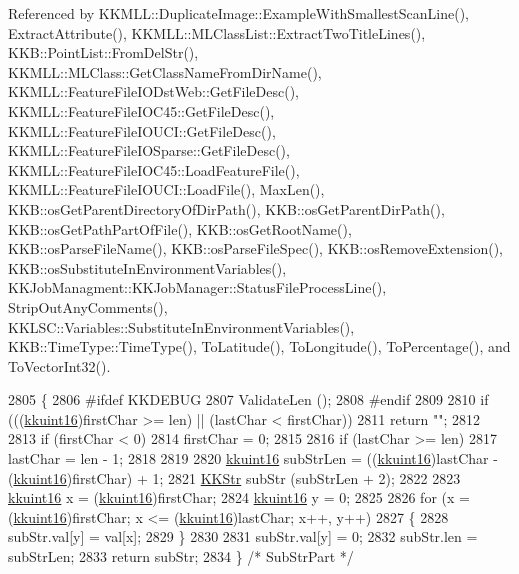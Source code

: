Referenced by K\+K\+M\+L\+L\+::\+Duplicate\+Image\+::\+Example\+With\+Smallest\+Scan\+Line(), Extract\+Attribute(), K\+K\+M\+L\+L\+::\+M\+L\+Class\+List\+::\+Extract\+Two\+Title\+Lines(), K\+K\+B\+::\+Point\+List\+::\+From\+Del\+Str(), K\+K\+M\+L\+L\+::\+M\+L\+Class\+::\+Get\+Class\+Name\+From\+Dir\+Name(), K\+K\+M\+L\+L\+::\+Feature\+File\+I\+O\+Dst\+Web\+::\+Get\+File\+Desc(), K\+K\+M\+L\+L\+::\+Feature\+File\+I\+O\+C45\+::\+Get\+File\+Desc(), K\+K\+M\+L\+L\+::\+Feature\+File\+I\+O\+U\+C\+I\+::\+Get\+File\+Desc(), K\+K\+M\+L\+L\+::\+Feature\+File\+I\+O\+Sparse\+::\+Get\+File\+Desc(), K\+K\+M\+L\+L\+::\+Feature\+File\+I\+O\+C45\+::\+Load\+Feature\+File(), K\+K\+M\+L\+L\+::\+Feature\+File\+I\+O\+U\+C\+I\+::\+Load\+File(), Max\+Len(), K\+K\+B\+::os\+Get\+Parent\+Directory\+Of\+Dir\+Path(), K\+K\+B\+::os\+Get\+Parent\+Dir\+Path(), K\+K\+B\+::os\+Get\+Path\+Part\+Of\+File(), K\+K\+B\+::os\+Get\+Root\+Name(), K\+K\+B\+::os\+Parse\+File\+Name(), K\+K\+B\+::os\+Parse\+File\+Spec(), K\+K\+B\+::os\+Remove\+Extension(), K\+K\+B\+::os\+Substitute\+In\+Environment\+Variables(), K\+K\+Job\+Managment\+::\+K\+K\+Job\+Manager\+::\+Status\+File\+Process\+Line(), Strip\+Out\+Any\+Comments(), K\+K\+L\+S\+C\+::\+Variables\+::\+Substitute\+In\+Environment\+Variables(), K\+K\+B\+::\+Time\+Type\+::\+Time\+Type(), To\+Latitude(), To\+Longitude(), To\+Percentage(), and To\+Vector\+Int32().


\begin{DoxyCode}
2805 \{
2806 \textcolor{preprocessor}{  #ifdef  KKDEBUG}
2807   ValidateLen ();
2808 \textcolor{preprocessor}{  #endif}
2809 
2810   \textcolor{keywordflow}{if}  (((\hyperlink{namespace_k_k_b_aa8c7d4d30381c8a0b6fce68974a9c8a9}{kkuint16})firstChar >= len)  ||  (lastChar < firstChar))
2811     \textcolor{keywordflow}{return}  \textcolor{stringliteral}{""};
2812 
2813   \textcolor{keywordflow}{if}  (firstChar < 0)
2814     firstChar = 0;
2815 
2816   \textcolor{keywordflow}{if}  (lastChar >= len)
2817     lastChar = len - 1;
2818 
2819 
2820   \hyperlink{namespace_k_k_b_aa8c7d4d30381c8a0b6fce68974a9c8a9}{kkuint16}  subStrLen = ((\hyperlink{namespace_k_k_b_aa8c7d4d30381c8a0b6fce68974a9c8a9}{kkuint16})lastChar - (\hyperlink{namespace_k_k_b_aa8c7d4d30381c8a0b6fce68974a9c8a9}{kkuint16})firstChar) + 1;
2821   \hyperlink{class_k_k_b_1_1_k_k_str}{KKStr}  subStr (subStrLen + 2);
2822 
2823   \hyperlink{namespace_k_k_b_aa8c7d4d30381c8a0b6fce68974a9c8a9}{kkuint16}  x = (\hyperlink{namespace_k_k_b_aa8c7d4d30381c8a0b6fce68974a9c8a9}{kkuint16})firstChar;
2824   \hyperlink{namespace_k_k_b_aa8c7d4d30381c8a0b6fce68974a9c8a9}{kkuint16}  y = 0;
2825 
2826   \textcolor{keywordflow}{for}  (x = (\hyperlink{namespace_k_k_b_aa8c7d4d30381c8a0b6fce68974a9c8a9}{kkuint16})firstChar; x <= (\hyperlink{namespace_k_k_b_aa8c7d4d30381c8a0b6fce68974a9c8a9}{kkuint16})lastChar;  x++, y++)
2827   \{
2828     subStr.val[y] = val[x];
2829   \}
2830   
2831   subStr.val[y] = 0;
2832   subStr.len = subStrLen;
2833   \textcolor{keywordflow}{return}  subStr;
2834 \}  \textcolor{comment}{/* SubStrPart */}
\end{DoxyCode}
